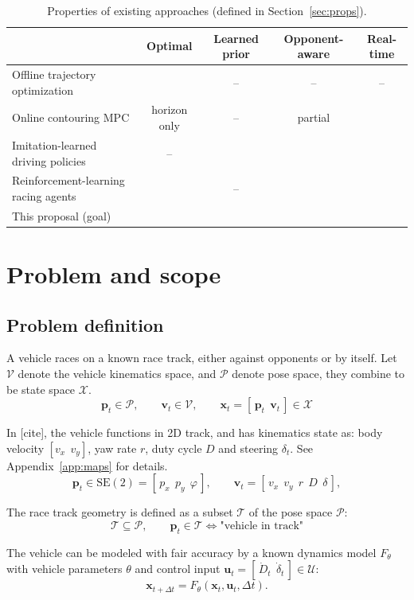 \documentclass[11pt]{article}
\newif\iftodo \todotrue
\DeclareRobustCommand{\todo}[1]{\iftodo\ifmmode\text{\sffamily\small\color{cL}[TODO: #1]}%
  \else\leavevmode{\sffamily\small\color{cL}[TODO: #1]}\fi\fi}
\newcommand{\bx}{\mathbf x}
\newcommand{\bp}{\mathbf p}
\newcommand{\bv}{\mathbf v}
\newcommand{\bu}{\mathbf u}
\newcommand{\ok}{\checkmark}
\begin{document}
\begin{table}[h!]
\centering\small
\begin{tabular}{@{}lcccc@{}}
\toprule
 & Optimal & Learned prior & Opponent-aware & Real-time\\
\midrule
Offline trajectory optimization & \ok & -- & -- & --\\
Online contouring MPC           & horizon only & -- & partial & \ok\\
Imitation-learned driving policies & -- & \ok & \ok & \ok\\
Reinforcement-learning racing agents & \ok & -- & \ok & \ok\\
\midrule
This proposal (goal)            & \ok & \ok & \ok & \ok\\
\bottomrule
\end{tabular}
\caption{Properties of existing approaches (defined in Section~\ref{sec:props}).
\todo{verify each cell}}
\label{tab:gap}
\end{table}


\pagebreak
\section{Problem and scope}\label{sec:problem}

\subsection{Problem definition}

A vehicle races on a known race track, either against opponents or by itself. Let $\mathcal V$ denote the vehicle kinematics space, and $\mathcal P$ denote pose space, they combine to be state space $\mathcal X$. 
\[
\bp_t\in\mathcal P,\qquad \bv_t\in\mathcal V, \qquad \bx_t=[\,\bp_t\ \ \bv_t\,]\in\mathcal X
\]

In [cite], the vehicle functions in 2D track, and has kinematics state as: body velocity $[ v_x\ \ v_y ]$, yaw rate $r$, duty cycle $D$  
and steering $\delta_t$. See Appendix~\ref{app:maps} for details.
\[
\bp_t \in \mathrm{SE}(2)=[\,p_x\ \ p_y\ \ \varphi\,],\qquad
\bv_t=[\,v_x\ \ v_y \ \ r\ \ D\ \ \delta\,],
\]

The race track geometry is defined as a subset $\mathcal T$ of the pose space
$\mathcal P$:
\[
\mathcal T\subseteq\mathcal P,\qquad \bp_t\in\mathcal T\iff\text{"vehicle in track"}
\]

The vehicle can be modeled with fair accuracy by a known dynamics model $F_\theta$ with
vehicle parameters $\theta$ and control input $\bu_t=[\,\dot D_t\ \ \dot\delta_t\,]\in\mathcal U$:
\[
\bx_{t+\Delta t}=F_\theta(\bx_t,\bu_t,\Delta t).
\]
\end{document}
